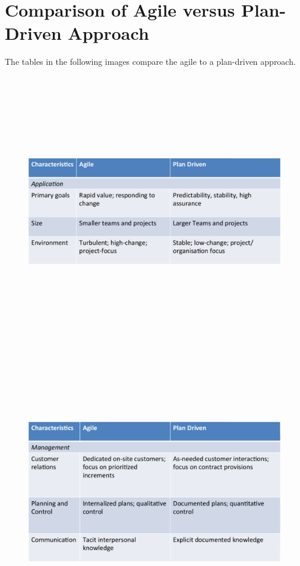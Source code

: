 \documentclass{report}
\begin{document}
\section{Comparison of Agile versus Plan-Driven Approach}
The tables in the following images compare the agile to a plan-driven approach. 
\begin{figure}[h]
\begin{center} 
    \includegraphics[scale=0.8,width = 15cm, height = 12cm]{images/AgileTable1.pdf}
\end{center}
\end{figure}

\begin{figure}[h]
\begin{center} 
    \includegraphics[scale=0.8,width = 15cm, height = 12cm]{images/AgileTable2.pdf}
\end{center}
\end{figure}
\end{document}
